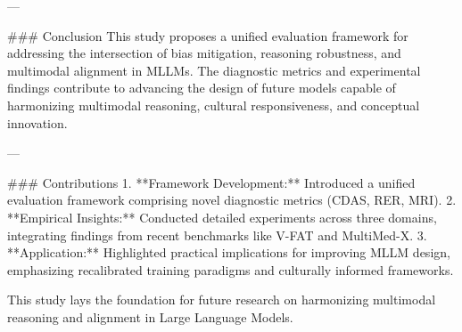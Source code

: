 ---

### Conclusion  
This study proposes a unified evaluation framework for addressing the intersection of bias mitigation, reasoning robustness, and multimodal alignment in MLLMs. The diagnostic metrics and experimental findings contribute to advancing the design of future models capable of harmonizing multimodal reasoning, cultural responsiveness, and conceptual innovation.

---

### Contributions  
1. **Framework Development:** Introduced a unified evaluation framework comprising novel diagnostic metrics (CDAS, RER, MRI).  
2. **Empirical Insights:** Conducted detailed experiments across three domains, integrating findings from recent benchmarks like V-FAT and MultiMed-X.  
3. **Application:** Highlighted practical implications for improving MLLM design, emphasizing recalibrated training paradigms and culturally informed frameworks.  

This study lays the foundation for future research on harmonizing multimodal reasoning and alignment in Large Language Models.
